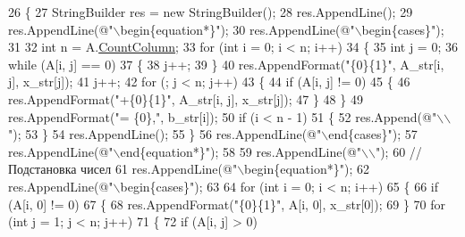 \begin{DoxyCode}
26         \{
27             StringBuilder res = \textcolor{keyword}{new} StringBuilder();
28             res.AppendLine();
29             res.AppendLine(\textcolor{stringliteral}{@"\(\backslash\)begin\{equation*\}"});
30             res.AppendLine(\textcolor{stringliteral}{@"\(\backslash\)begin\{cases\}"});
31 
32             \textcolor{keywordtype}{int} n = A.\hyperlink{class_b_l_a_s_1_1_matrix_aae67f388c0c049518adc10781e29d091}{CountColumn};
33             \textcolor{keywordflow}{for} (\textcolor{keywordtype}{int} i = 0; i < n; i++)
34             \{
35                 \textcolor{keywordtype}{int} j = 0;
36                 \textcolor{keywordflow}{while} (A[i, j] == 0)
37                 \{
38                     j++;
39                 \}
40                 res.AppendFormat(\textcolor{stringliteral}{"\{0\}\{1\}"}, A\_str[i, j], x\_str[j]);
41                 j++;
42                 \textcolor{keywordflow}{for} (; j < n; j++)
43                 \{
44                     \textcolor{keywordflow}{if} (A[i, j] != 0)
45                     \{
46                         res.AppendFormat(\textcolor{stringliteral}{"+\{0\}\{1\}"}, A\_str[i, j], x\_str[j]);
47                     \}
48                 \}
49                 res.AppendFormat(\textcolor{stringliteral}{"= \{0\},"}, b\_str[i]);
50                 \textcolor{keywordflow}{if} (i < n - 1)
51                 \{
52                     res.Append(\textcolor{stringliteral}{@"\(\backslash\)\(\backslash\)"});
53                 \}
54                 res.AppendLine();
55             \}
56             res.AppendLine(\textcolor{stringliteral}{@"\(\backslash\)end\{cases\}"});
57             res.AppendLine(\textcolor{stringliteral}{@"\(\backslash\)end\{equation*\}"});
58 
59             res.AppendLine(\textcolor{stringliteral}{@"\(\backslash\)\(\backslash\)"});
60             \textcolor{comment}{//Подстановка чисел}
61             res.AppendLine(\textcolor{stringliteral}{@"\(\backslash\)begin\{equation*\}"});
62             res.AppendLine(\textcolor{stringliteral}{@"\(\backslash\)begin\{cases\}"});
63 
64             \textcolor{keywordflow}{for} (\textcolor{keywordtype}{int} i = 0; i < n; i++)
65             \{
66                 \textcolor{keywordflow}{if} (A[i, 0] != 0)
67                 \{
68                     res.AppendFormat(\textcolor{stringliteral}{"\{0\}\{1\}"}, A[i, 0], x\_str[0]);
69                 \}
70                 \textcolor{keywordflow}{for} (\textcolor{keywordtype}{int} j = 1; j < n; j++)
71                 \{
72                     \textcolor{keywordflow}{if} (A[i, j] > 0)

\end{DoxyCode}

